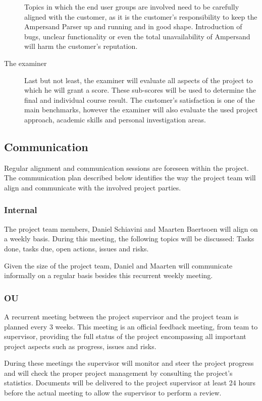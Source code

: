 \begin{description}
	Topics in which the end user groups are involved need to be carefully aligned with the customer, as it is the customer's responsibility to keep the Ampersand Parser up and running and in good shape.
	Introduction of bugs, unclear functionality or even the total unavailability of Ampersand will harm the customer's reputation.

	\item[The examiner]
	Last but not least, the examiner will evaluate all aspects of the project to which he will grant a score.
	These sub-scores will be used to determine the final and individual course result.
	The customer's satisfaction is one of the main benchmarks, however the examiner will also evaluate the used project approach, academic skills and personal investigation areas.
\end {description}

\subsection{Communication}
\label{subsec:communication}
Regular alignment and communication sessions are foreseen within the project.
The communication plan described below identifies the way the project team will align and communicate with the involved project parties.

\subsubsection{Internal}
The project team members, Daniel Schiavini and Maarten Baertsoen will align on a weekly basis.
During this meeting, the following topics will be discussed: Tasks done, tasks due, open actions, issues and risks.

Given the size of the project team, Daniel and Maarten will communicate informally on a regular basis besides this recurrent weekly meeting.

\subsubsection{OU}
%
A recurrent meeting between the project supervisor and the project team is planned every 3 weeks.
This meeting is an official feedback meeting, from team to supervisor, providing the full status of the project encompassing all important project aspects such as progress, issues and risks.

During these meetings the supervisor will monitor and steer the project progress and will check the proper project management by consulting the project's statistics.
Documents will be delivered to the project supervisor at least 24 hours before the actual meeting to allow the supervisor to perform a review.

